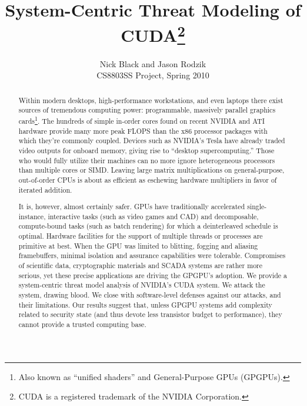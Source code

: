 \documentclass[letterpaper,10pt]{article}
\title{System-Centric Threat Modeling of CUDA\footnote{CUDA\textsuperscript{\textregistered}
is a registered trademark of the NVIDIA Corporation.}}
\author{Nick Black and Jason Rodzik\\
CS8803SS Project, Spring 2010}
\date{}
\begin{document}
\maketitle

\begin{abstract}
Within modern desktops, high-performance workstations, and even laptops there
exist sources of tremendous computing power: programmable, massively parallel graphics cards\footnote{Also known as ``unified shaders'' and General-Purpose GPUs (GPGPUs).}.
The hundreds of simple in-order cores found on recent NVIDIA and ATI hardware provide many more peak FLOPS than the x86 processor packages with
which they're commonly coupled.
Devices such as NVIDIA's Tesla\texttrademark{} have already traded video outputs for onboard memory, giving rise to ``desktop
supercomputing.'' Those who would fully utilize their machines can
no more ignore heterogeneous processors than multiple cores or SIMD. Leaving
large matrix multiplications on general-purpose, out-of-order CPUs is about as
efficient as eschewing hardware multipliers in favor of iterated addition.

It is, however, almost certainly safer. GPUs have traditionally accelerated
single-instance, interactive tasks (such as video games and CAD) and
decomposable, compute-bound tasks (such as batch rendering) for which a
deinterleaved schedule is optimal. Hardware facilities for the support of
multiple threads or processes are primitive at best. When the GPU was limited to
blitting, fogging and aliasing framebuffers, minimal isolation and
assurance capabilities were tolerable. Compromises of scientific data,
cryptographic materials and SCADA systems are rather more serious, yet these
precise applications are driving the GPGPU's adoption. We provide a system-centric threat
model analysis of NVIDIA's CUDA system. We attack the system, drawing blood.
We close with software-level defenses against our attacks, and their limitations.
Our results suggest that, unless GPGPU systems add complexity related to security state (and thus devote
less transistor budget to performance), they cannot provide a trusted computing
base.

\end{abstract}
\end{document}
